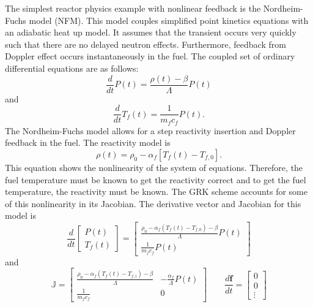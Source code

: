 \documentclass{ansconf}
\numberwithin{equation}{section}
\begin{document}

The simplest reactor physics example with nonlinear feedback is the Nordheim-Fuchs model (NFM). This model couples simplified point kinetics equations with an adiabatic heat up model. It assumes that the transient occurs very quickly such that there are no delayed neutron effects. Furthermore, feedback from Doppler effect occurs instantaneously in the fuel.  The coupled set of ordinary differential equations are as follows:
\begin{equation}
    \frac{d}{dt}P\left(t\right) = \frac{\rho\left(t\right)-\beta}{\Lambda}P\left(t\right)
\end{equation}
and
\begin{equation}
    \frac{d}{dt}T_f\left(t\right) = \frac{1}{m_fc_f}P\left(t\right).
\end{equation}
The Nordheim-Fuchs model allows for a step reactivity insertion and Doppler feedback in the fuel. The reactivity model is 
\begin{equation}
    \rho\left(t\right) = \rho_0 - \alpha_f\left[T_f\left(t\right) - T_{f,0}\right].
\end{equation}
This equation shows the nonlinearity of the system of equations. Therefore, the fuel temperature must be known to get the reactivity correct and to get the fuel temperature, the reactivity must be known. The GRK scheme accounts for some of this nonlinearity in its Jacobian. The derivative vector and Jacobian for this model is
\begin{equation}
    \frac{d}{dt}\left[\begin{array}{c}
                        P\left(t\right) \\
                        T_f\left(t\right)
                      \end{array}\right] =
                \left[\begin{array}{c}
                        \frac{\rho_0 - \alpha_f\left(T_f\left(t\right) - T_{f,0}\right) - \beta}{\Lambda}P\left(t\right) \\
                        \frac{1}{m_fc_f}P\left(t\right)
                      \end{array}\right]
\end{equation}
and
\begin{equation}
    \mathbb{J} = \left[\begin{array}{cc}
                         \frac{\rho_0 - \alpha_f\left(T_f\left(t\right) - T_{f,i}\right) - \beta}{\Lambda} & -\frac{\alpha_f}{\Lambda}P\left(t\right) \\
                         \frac{1}{m_fc_f} & 0
                       \end{array}\right]
     \qquad
     \frac{d\mathbf{f}}{dt} = \left[\begin{array}{c}
                        0 \\
                        0 \\
                        \vdots
                      \end{array}\right]
\end{equation}
\end{document}
